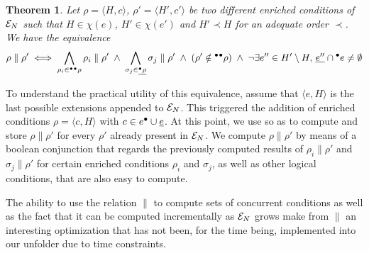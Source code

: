 \documentclass[11pt,a4paper]{article}
\newtheorem{theorem}{Theorem}
\begin{document}
\begin{theorem}
\label{thm:two.different}
Let $\rho = \langle H, c \rangle$, $\rho' = \langle H', c' \rangle$ be two
different enriched conditions of $\mathcal{E}_{N}$ such that $H \in \chi(e)$, $H' \in
\chi(e')$ and $H' \prec H$ for an adequate order $\prec$.  We have the
equivalence $$\rho \parallel \rho' \iff \bigwedge_{\rho_i \in {}^\bullet{}^\bullet\rho}
\rho_i \parallel \rho' \; \land \; \bigwedge_{\sigma_j \in \underline{{}^\bullet\rho}}
\sigma_j \parallel \rho' \; \land \; (\rho' \notin {}^\bullet{}^\bullet\rho) \; \land \;
\lnot \exists e'' \in H' \setminus H,\, \underline{e''} \cap {}^\bullet e \not=
\emptyset$$
\end{theorem}

To understand the practical utility of this equivalence, assume that $\langle
e, H \rangle$ is the last possible extensions appended to $\mathcal{E}_{N}$.  This
triggered the addition of enriched conditions $\rho = \langle c, H \rangle$
with $c \in e^\bullet \cup \underline{e}$.  At this point, we use 
so as to compute and store $\rho \parallel \rho'$ for every $\rho'$ already
present in $\mathcal{E}_{N}$.  We compute $\rho \parallel \rho'$ by means of a boolean
conjunction that regards the previously computed results of $\rho_i \parallel
\rho'$ and $\sigma_j \parallel \rho'$ for certain enriched conditions $\rho_i$
and $\sigma_j$, as well as other logical conditions, that are also easy to
compute.

The ability to use the relation $\parallel$ to compute sets of concurrent
conditions as well as the fact that it can be computed incrementally as $\mathcal{E}_{N}$ grows make from $\parallel$ an interesting optimization that has not been,
for the time being, implemented into our unfolder due to time constraints.
\end{document}
